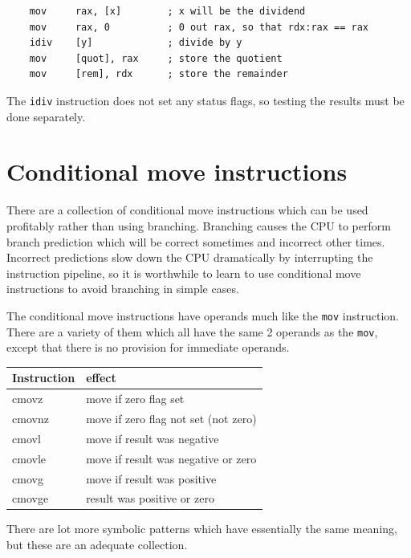 \documentclass[11pt,b5paper]{book}
\begin{document}
\begin{verbatim}
    mov     rax, [x]        ; x will be the dividend
    mov     rax, 0          ; 0 out rax, so that rdx:rax == rax
    idiv    [y]             ; divide by y
    mov     [quot], rax     ; store the quotient
    mov     [rem], rdx      ; store the remainder
\end{verbatim}

The {\tt idiv} instruction does not set any status flags, so testing the
results must be done separately.


\section{Conditional move instructions}

There are a collection of conditional move instructions which can be used  
profitably rather than using branching.
Branching causes the CPU to perform branch prediction which will be correct
sometimes and incorrect other times.
Incorrect predictions slow down the CPU dramatically by
interrupting the instruction pipeline, so it is worthwhile to
learn to use conditional move instructions to avoid branching in simple cases.

The conditional move instructions have operands much like the {\tt mov}
instruction.  There are a variety of them which all have the same 2 operands
as the {\tt mov}, except that there is no provision for immediate operands. 
\begin{center}
\begin{tabular}{|l|l|}
\hline
Instruction & effect \\
\hline
cmovz       & move if zero flag set \\
\hline
cmovnz       & move if zero flag not set (not zero) \\
\hline
cmovl       & move if result was negative \\
\hline
cmovle       & move if result was negative or zero \\
\hline
cmovg       & move if result was positive \\
\hline
cmovge       & result was positive or zero \\
\hline
\end{tabular}
\end{center}

There are lot more symbolic patterns which have essentially the same meaning,
but these are an adequate collection.
\end{document}
